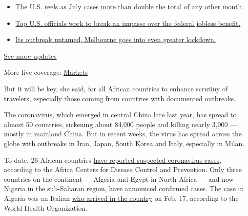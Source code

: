 \begin{itemize}
\tightlist
\item
  \href{https://www.nytimes.com/2020/08/01/world/coronavirus-covid-19.html?action=click\&pgtype=Article\&state=default\&region=MAIN_CONTENT_1\&context=storylines_live_updates\#link-34047410}{The
  U.S. reels as July cases more than double the total of any other
  month.}
\item
  \href{https://www.nytimes.com/2020/08/01/world/coronavirus-covid-19.html?action=click\&pgtype=Article\&state=default\&region=MAIN_CONTENT_1\&context=storylines_live_updates\#link-780ec966}{Top
  U.S. officials work to break an impasse over the federal jobless
  benefit.}
\item
  \href{https://www.nytimes.com/2020/08/01/world/coronavirus-covid-19.html?action=click\&pgtype=Article\&state=default\&region=MAIN_CONTENT_1\&context=storylines_live_updates\#link-2bc8948}{Its
  outbreak untamed, Melbourne goes into even greater lockdown.}
\end{itemize}

\href{https://www.nytimes.com/2020/08/01/world/coronavirus-covid-19.html?action=click\&pgtype=Article\&state=default\&region=MAIN_CONTENT_1\&context=storylines_live_updates}{See
more updates}

More live coverage:
\href{https://www.nytimes.com/live/2020/07/31/business/stock-market-today-coronavirus?action=click\&pgtype=Article\&state=default\&region=MAIN_CONTENT_1\&context=storylines_live_updates}{Markets}

But it will be key, she said, for all African countries to enhance
scrutiny of travelers, especially those coming from countries with
documented outbreaks.

The coronavirus, which emerged in central China late last year, has
spread to almost 50 countries, sickening about 84,000 people and killing
nearly 3,000 --- mostly in mainland China. But in recent weeks, the
virus has spread across the globe with outbreaks in Iran, Japan, South
Korea and Italy, especially in Milan.

To date, 26 African countries
\href{http://www.africacdc.org/press-centre/news/123-outbreak-update-on-the-ongoing-novel-coronavirus-global-epidemic-issue-6-25-feb-2020}{have
reported suspected coronavirus cases}, according to the Africa Centers
for Disease Control and Prevention. Only three countries on the
continent --- Algeria and Egypt in North Africa --- and now Nigeria in
the sub-Saharan region, have announced confirmed cases. The case in
Algeria was an Italian
\href{https://www.afro.who.int/news/second-covid-19-case-confirmed-africa}{who
arrived in the country} on Feb. 17, according to the World Health
Organization.

